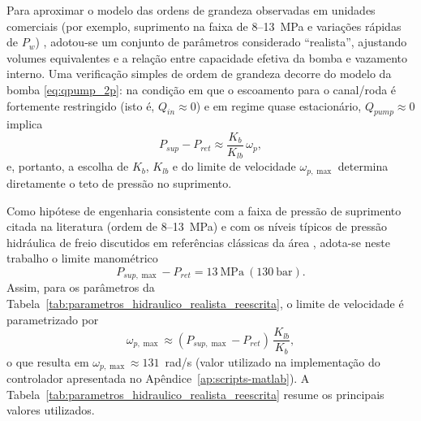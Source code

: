 Para aproximar o modelo das ordens de grandeza observadas em unidades comerciais (por exemplo, suprimento na faixa de 8--13~MPa e variações rápidas de $P_w$) \cite{ZengYangHuang2023,HouhuaJing2022}, adotou-se um conjunto de parâmetros considerado “realista”, ajustando volumes equivalentes e a relação entre capacidade efetiva da bomba e vazamento interno. Uma verificação simples de ordem de grandeza decorre do modelo da bomba \eqref{eq:qpump_2p}: na condição em que o escoamento para o canal/roda é fortemente restringido (isto é, $Q_{in}\approx 0$) e em regime quase estacionário, $Q_{pump}\approx 0$ implica
\begin{equation}
    P_{sup}-P_{ret} \approx \frac{K_b}{K_{lb}}\,\omega_p,
    \label{eq:ordem_grandeza_psup}
\end{equation}
e, portanto, a escolha de $K_b$, $K_{lb}$ e do limite de velocidade $\omega_{p,\max}$ determina diretamente o teto de pressão no suprimento.

Como hipótese de engenharia consistente com a faixa de pressão de suprimento citada na literatura (ordem de 8--13~MPa) \cite{ZengYangHuang2023,HouhuaJing2022} e com os níveis típicos de pressão hidráulica de freio discutidos em referências clássicas da área \cite{Konrad2014,Rudolf2011}, adota-se neste trabalho o limite manométrico
\begin{equation}
    P_{sup,\max}-P_{ret} = 13~\text{MPa}\ (130~\text{bar}).
    \label{eq:psup_max_assumido}
\end{equation}
Assim, para os parâmetros da Tabela~\ref{tab:parametros_hidraulico_realista_reescrita}, o limite de velocidade é parametrizado por
\begin{equation}
    \omega_{p,\max} \approx (P_{sup,\max}-P_{ret})\,\frac{K_{lb}}{K_b},
    \label{eq:omega_max_via_psupmax}
\end{equation}
o que resulta em $\omega_{p,\max}\approx 131$~rad/s (valor utilizado na implementação do controlador apresentada no Apêndice~\ref{ap:scripts-matlab}). A Tabela~\ref{tab:parametros_hidraulico_realista_reescrita} resume os principais valores utilizados.

